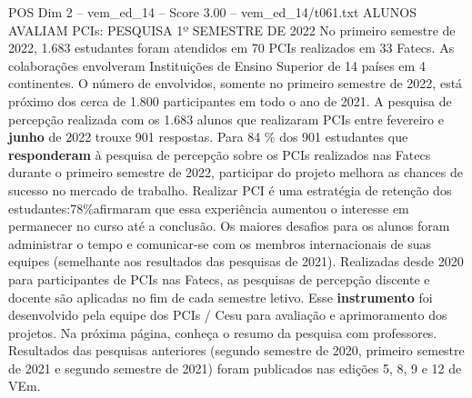 \begin{textsample}{POS Dim 2 – vem\_ed\_14 – Score 3.00 – vem\_ed\_14/t061.txt}  \label{ex:f2_pos_121}
ALUNOS AVALIAM PCIs: PESQUISA 1º SEMESTRE DE 2022 No primeiro semestre de 2022, 1.683 estudantes foram atendidos em 70 PCIs realizados em 33 Fatecs.
As colaborações envolveram Instituições de Ensino Superior de 14 países em 4 continentes.
O número de envolvidos, somente no primeiro semestre de 2022, está próximo dos cerca de 1.800 participantes em todo o ano de 2021.
A pesquisa de percepção realizada com os 1.683 alunos que realizaram PCIs entre fevereiro e \textbf{junho} de 2022 trouxe 901 respostas.
Para 84 \% dos 901 estudantes que \textbf{responderam} à pesquisa de percepção sobre os PCIs realizados nas Fatecs durante o primeiro semestre de 2022, participar do projeto melhora as chances de sucesso no mercado de trabalho.
Realizar PCI é uma estratégia de retenção dos estudantes:78\%afirmaram que essa experiência aumentou o interesse em permanecer no curso até a conclusão.
Os maiores desafios para os alunos foram administrar o tempo e comunicar-se com os membros internacionais de suas equipes (semelhante aos resultados das pesquisas de 2021).
Realizadas desde 2020 para participantes de PCIs nas Fatecs, as pesquisas de percepção discente e docente são aplicadas no fim de cada semestre letivo.
Esse \textbf{instrumento} foi desenvolvido pela equipe dos PCIs / Cesu para avaliação e aprimoramento dos projetos.
Na próxima página, conheça o resumo da pesquisa com professores.
Resultados das pesquisas anteriores (segundo semestre de 2020, primeiro semestre de 2021 e segundo semestre de 2021) foram publicados nas edições 5, 8, 9 e 12 de VEm.

\end{textsample}
